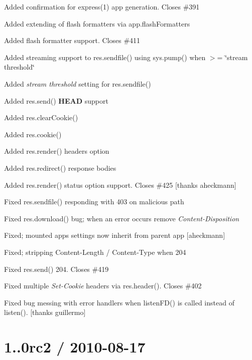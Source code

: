 \begin{DoxyItemize}
\item Added confirmation for {\ttfamily express(1)} app generation. Closes \#391
\item Added extending of flash formatters via {\ttfamily app.\+flash\+Formatters}
\item Added flash formatter support. Closes \#411
\item Added streaming support to {\ttfamily res.\+sendfile()} using {\ttfamily sys.\+pump()} when $>$= \char`\"{}stream threshold\char`\"{}
\item Added {\itshape stream threshold} setting for {\ttfamily res.\+sendfile()}
\item Added {\ttfamily res.\+send()} {\bfseries H\+E\+A\+D} support
\item Added {\ttfamily res.\+clear\+Cookie()}
\item Added {\ttfamily res.\+cookie()}
\item Added {\ttfamily res.\+render()} headers option
\item Added {\ttfamily res.\+redirect()} response bodies
\item Added {\ttfamily res.\+render()} status option support. Closes \#425 \mbox{[}thanks aheckmann\mbox{]}
\item Fixed {\ttfamily res.\+sendfile()} responding with 403 on malicious path
\item Fixed {\ttfamily res.\+download()} bug; when an error occurs remove {\itshape Content-\/\+Disposition}
\item Fixed; mounted apps settings now inherit from parent app \mbox{[}aheckmann\mbox{]}
\item Fixed; stripping Content-\/\+Length / Content-\/\+Type when 204
\item Fixed {\ttfamily res.\+send()} 204. Closes \#419
\item Fixed multiple {\itshape Set-\/\+Cookie} headers via {\ttfamily res.\+header()}. Closes \#402
\item Fixed bug messing with error handlers when {\ttfamily listen\+F\+D()} is called instead of {\ttfamily listen()}. \mbox{[}thanks guillermo\mbox{]}
\end{DoxyItemize}

\section*{1..\+0rc2 / 2010-\/08-\/17 }


